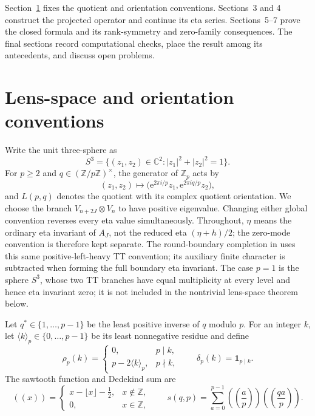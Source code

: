 \documentclass[11pt]{article}
\theoremstyle{definition}
\newcommand{\Z}{\mathbb Z}
\newcommand{\C}{\mathbb C}
\newcommand{\ind}{\mathbf 1}
\newcommand{\e}{\mathrm e}
\begin{document}
Section~\ref{sec:conventions} fixes the quotient and orientation conventions.
Sections~3 and 4 construct the projected operator and continue its eta
series.  Sections~5--7 prove the closed formula and its rank-symmetry and
zero-family consequences.  The final sections record computational checks,
place the result among its antecedents, and discuss open problems.

\section{Lens-space and orientation conventions}
\label{sec:conventions}

Write the unit three-sphere as
\[
 S^3=\{(z_1,z_2)\in\C^2:|z_1|^2+|z_2|^2=1\}.
\]
For $p\geq2$ and $q\in(\Z/p\Z)^\times$, the generator of $\Z_p$ acts by
\[
 (z_1,z_2)\longmapsto
 \bigl(\e^{2\pi i/p}z_1,\e^{2\pi iq/p}z_2\bigr),
\]
and $L(p,q)$ denotes the quotient with its complex quotient orientation.  We
choose the branch $V_{n+2J}\otimes V_n$ to have positive eigenvalue.  Changing
either global convention reverses every eta value simultaneously.
Throughout, $\eta$ means the ordinary eta invariant of $A_J$, not the reduced eta
$(\eta+h)/2$; the zero-mode convention is therefore kept separate.
The round-boundary completion in \cite{Mahmood2026SteinWeissAPSBoundary}
uses this same positive-left-heavy TT convention; its auxiliary finite
character is subtracted when forming the full boundary eta invariant.
The case $p=1$ is the sphere $S^3$, whose two TT branches have equal
multiplicity at every level and hence eta invariant zero; it is not included
in the nontrivial lens-space theorem below.

Let $q^*\in\{1,\ldots,p-1\}$ be the least positive inverse of $q$ modulo
$p$.  For an integer $k$, let $\langle k\rangle_p\in\{0,\ldots,p-1\}$ be its
least nonnegative residue and define
\begin{equation}
\rho_p(k)=
\begin{cases}
0,&p\mid k,\\
p-2\langle k\rangle_p,&p\nmid k,
\end{cases}
\qquad
\delta_p(k)=\ind_{p\mid k}.
\label{eq:rho-delta}
\end{equation}
The sawtooth function and Dedekind sum are
\[
 \left(\!\left(x\right)\!\right)=
 \begin{cases}
 x-\lfloor x\rfloor-\tfrac12,&x\notin\Z,\\
 0,&x\in\Z,
 \end{cases}
 \qquad
 s(q,p)=\sum_{a=0}^{p-1}
 \left(\!\left(\frac ap\right)\!\right)
 \left(\!\left(\frac{qa}{p}\right)\!\right).
\]
\end{document}
